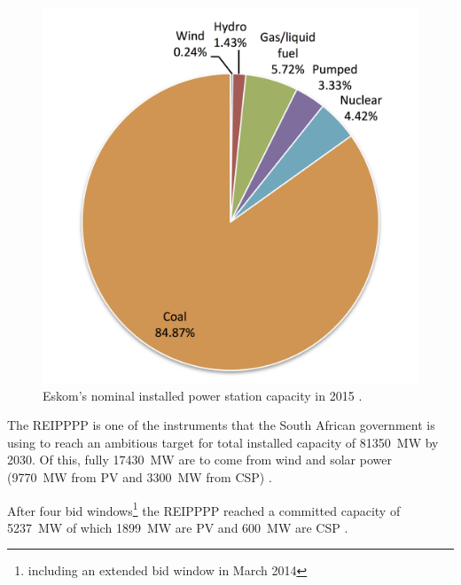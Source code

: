 \begin{figure}[htbp]  
\centering
\includegraphics[width=0.45\linewidth]{FIG/Pgenerationeskom}
\caption[Eskom's nominal installed power station capacity in 2015.]{Eskom's nominal installed power station capacity in 2015 \cite{Eskom2015a}.}\label{PgenerationEskom}
\end{figure}
%
The \ac{REIPPPP} is one of the instruments that the South African government is using to reach an ambitious target for total installed capacity of \SI{81350}{\mega\watt} by 2030. Of this, fully \SI{17430}{\mega\watt} are to come from wind and solar power (\SI{9770}{\mega\watt} from \ac{PV} and \SI{3300}{\mega\watt} from \ac{CSP}) \cite{DoE2013}. \pagebreak

After four bid windows\footnote{including an extended bid window in March 2014} the \ac{REIPPPP} reached a committed capacity of \SI{5237}{\mega\watt} of which \SI{1899}{\mega\watt} are \ac{PV} and \SI{600}{\mega\watt} are \ac{CSP} \cite{DoE2015}.


